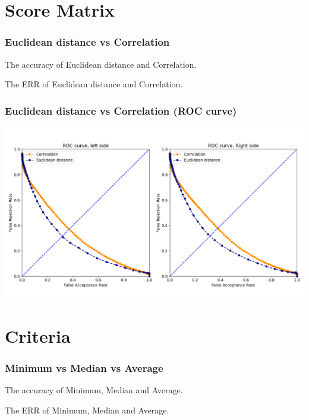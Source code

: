 \documentclass{beamer}
\begin{document}
\section{Score Matrix}

\begin{frame}
\frametitle{Euclidean distance vs Correlation}
\tiny
\begin{table}
\centering
\captionsetup{labelformat=empty}
\caption{\small The accuracy of Euclidean distance and Correlation.}
\label{tab:parameters condition}

\end{table}
\begin{table}
\centering
\captionsetup{labelformat=empty}
\caption{\small The  ERR of Euclidean distance and Correlation.}
\label{tab:parameters condition}

\end{table}
\end{frame}


\begin{frame}
\centering
\frametitle{Euclidean distance vs Correlation (ROC curve)}
\includegraphics[scale=0.3]{Manuscripts/src/figures/Correlation.png}
\end{frame}

\section{Criteria}

\begin{frame}
\frametitle{Minimum vs Median vs Average}
\tiny
\begin{table}
\centering
\captionsetup{labelformat=empty}
\caption{\small The accuracy of Minimum, Median and Average.}
\label{tab:parameters condition}

\end{table}
\begin{table}
\centering
\captionsetup{labelformat=empty}
\caption{\small The ERR of Minimum, Median and Average.}
\label{tab:parameters condition}

\end{table}
\end{frame}
\end{document}
